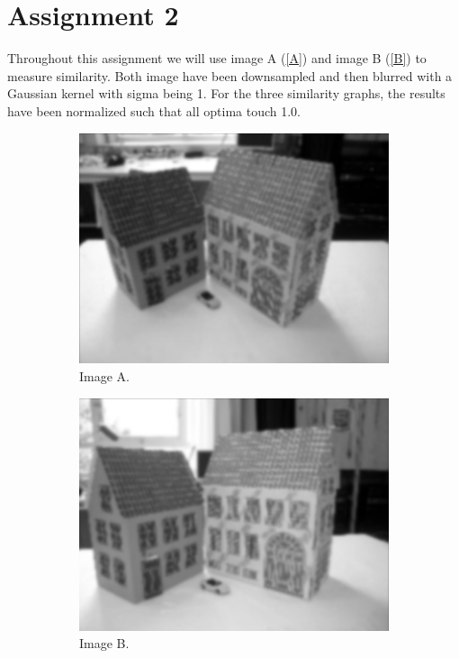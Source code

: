\section{Assignment 2}
Throughout this assignment we will use image A (\autoref{A}) and image B (\autoref{B}) to measure similarity. Both image have been downsampled and then blurred with a Gaussian kernel with sigma being 1. For the three similarity graphs, the results have been normalized such that all optima touch 1.0.
\begin{figure}[h]
	\centering
	\begin{subfigure}{0.4\linewidth}
		\centering
		\includegraphics[width=\linewidth]{Materials/A}
		\caption{Image A.}
		\label{A}
	\end{subfigure}
	\hspace{1cm}
	\begin{subfigure}{0.4\linewidth}
		\centering
		\includegraphics[width=\linewidth]{Materials/B}
		\caption{Image B.}
		\label{B}
	\end{subfigure}
	\caption{}
\end{figure}





